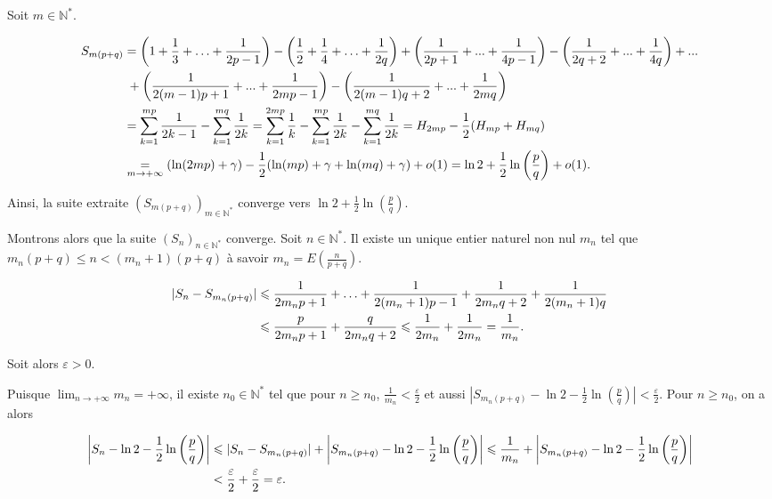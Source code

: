 \documentclass[11pt,a4paper]{article}
\newcommand{\Nn}{\mathbb{N}} \newcommand{\N}{\mathbb{N}}
\begin{document}
Soit $m\in\Nn^*$.

\begin{align*}\ensuremath
S_{m(p+q)}&=\left(1+\frac{1}{3}+\ldots+\frac{1}{2p-1}\right) -\left(\frac{1}{2}+\frac{1}{4}+\ldots+\frac{1}{2q}\right)+\left(\frac{1}{2p+1}+...+\frac{1}{4p-1}\right) -\left(\frac{1}{2q+2}+...+\frac{1}{4q}\right) +...\\
 &\;+\left(\frac{1}{2(m-1)p+1}+...+\frac{1}{2mp-1}\right) -\left(\frac{1}{2(m-1)q+2}+...+\frac{1}{2mq}\right)\\
 &=\sum_{k=1}^{mp}\frac{1}{2k-1}-\sum_{k=1}^{mq}\frac{1}{2k}=\sum_{k=1}^{2mp}\frac{1}{k}-\sum_{k=1}^{mp}\frac{1}{2k}-\sum_{k=1}^{mq}\frac{1}{2k}= H_{2mp} -\frac{1}{2}(H_{mp}+H_{mq})\\
  &\underset{m\rightarrow+\infty}{=}(\ln(2mp)+\gamma) -\frac{1}{2}(\ln(mp) +\gamma+\ln(mq) +\gamma)+ o(1)=\ln2 +\frac{1}{2}\ln\left(\frac{p}{q}\right)+o(1).
\end{align*}

Ainsi, la suite extraite $(S_{m(p+q)})_{m\in\Nn^*}$ converge vers $\ln2 +\frac{1}{2}\ln\left(\frac{p}{q}\right)$.

Montrons alors que la suite $(S_n)_{n\in\Nn^*}$ converge. Soit $n\in\Nn^*$. Il existe un unique entier naturel non nul $m_n$ tel que $m_n(p+q)\leqslant n <(m_n+1)(p+q)$ à savoir $m_n=E\left(\frac{n}{p+q}\right)$.

\begin{align*}\ensuremath
|S_n-S_{m_n(p+q)}|&\leqslant\frac{1}{2m_np+1}+\ldots+\frac{1}{2(m_n+1)p-1}+\frac{1}{2m_nq+2}+\frac{1}{2(m_n+1)q}\\
 &\leqslant\frac{p}{2m_np+1}+\frac{q}{2m_nq+2}\leqslant\frac{1}{2m_n}+\frac{1}{2m_n}=\frac{1}{m_n}.
\end{align*}

Soit alors $\varepsilon>0$.

Puisque $\lim_{n \rightarrow +\infty}m_n=+\infty$, il existe $n_0\in\Nn^*$ tel que pour $n\geqslant n_0$, $\frac{1}{m_n}<\frac{\varepsilon}{2}$ et aussi $\left|S_{m_n(p+q)}-\ln2-\frac{1}{2}\ln\left(\frac{p}{q}\right)\right|<\frac{\varepsilon}{2}$. Pour $n\geqslant n_0$, on a alors

\begin{align*}\ensuremath
\left|S_{n}-\ln2 -\frac{1}{2}\ln\left(\frac{p}{q}\right)\right|&\leqslant|S_n-S_{m_n(p+q)}|+\left|S_{m_n(p+q)}-\ln2-\frac{1}{2}\ln\left(\frac{p}{q}\right)\right|\leqslant\frac{1}{m_n}+\left|S_{m_n(p+q)}-\ln2-\frac{1}{2}\ln\left(\frac{p}{q}\right)\right|\\
 &<\frac{\varepsilon}{2}+\frac{\varepsilon}{2}=\varepsilon.
\end{align*}
\end{document}
